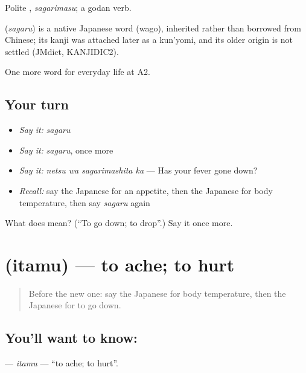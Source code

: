 Polite \textbf{}, \emph{sagarimasu}; a godan verb.

\begin{cousinweb}
\textbf{} (\emph{sagaru}) is a native Japanese word (wago), inherited rather than borrowed from Chinese; its kanji was attached later as a kun'yomi, and its older origin is not settled (JMdict, KANJIDIC2).
\end{cousinweb}

\begin{grammarlens}[title={What you've built}]
One more word for everyday life at A2.
\end{grammarlens}

\subsection*{Your turn}
\begin{itemize}
\raggedright
  \item \emph{Say it:} \emph{sagaru}
  \item \emph{Say it:} \emph{sagaru}, once more
  \item \emph{Say it:} \emph{netsu wa sagarimashita ka} — Has your fever gone down?
  \item \emph{Recall:} say the Japanese for an appetite, then the Japanese for body temperature, then say \emph{sagaru} again
\end{itemize}

\begin{tcolorbox}[breakable,colback=teal!4,colframe=teal!35!black,title={Before you move on}]
What does  mean? (\textquotedblleft{}To go down; to drop\textquotedblright{}.) Say it once more.
\end{tcolorbox}
\section[\texorpdfstring{\ja{いたむ} (itamu)}{いたむ (itamu)}]{ (itamu) — to ache; to hurt}

\label{lesson:JA-C221-itamu}



\begin{quote}
Before the new one: say the Japanese for body temperature, then the Japanese for to go down.
\end{quote}

\subsection*{You'll want to know: }
\textbf{} — \emph{itamu} — \textquotedblleft{}to ache; to hurt\textquotedblright{}.

